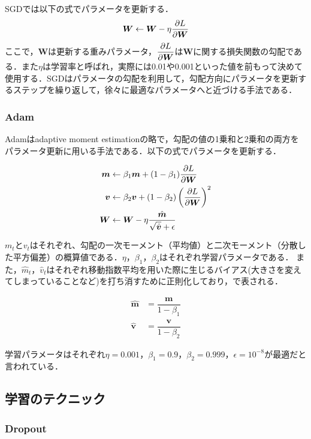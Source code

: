 SGDでは以下の式でパラメータを更新する．
\begin{align}\label{eq:SGD}
	\bm{W} \leftarrow \bm{W} - \eta \dfrac{\partial L}{\partial \bm{W}} 
\end{align}
ここで，$\bm{W}$は更新する重みパラメータ，$\dfrac{\partial L}{\partial \bm{W}}$は$\bm{W}$に関する損失関数の勾配である．また$\eta$は学習率と呼ばれ，実際には0.01や0.001といった値を前もって決めて使用する．SGDはパラメータの勾配を利用して，勾配方向にパラメータを更新するステップを繰り返して，徐々に最適なパラメータへと近づける手法である．

\subsubsection*{Adam}
Adam\cite{Adam}はadaptive moment estimationの略で，勾配の値の1乗和と2乗和の両方をパラメータ更新に用いる手法である．以下の式でパラメータを更新する．

\begin{align}\label{eq:adam}
	\bm{m} & \leftarrow \beta_1 \bm{m} + (1 - \beta_1) \dfrac{\partial L}{\partial \bm{W}} \\
	\bm{v} & \leftarrow \beta_2 \bm{v} + (1 - \beta_2) \left( \dfrac{\partial L}{\partial \bm{W}} \right) ^2 \\
	\bm{W} & \leftarrow \bm{W} - \eta \dfrac{\hat{\bm{m}}}{\sqrt{\hat{\bm{v}}} + \epsilon} 
\end{align}

$m_t$と$v_t$はそれぞれ、勾配の一次モーメント（平均値）と二次モーメント（分散した平方偏差）の概算値である．$\eta$，$\beta_1$，$\beta_2$はそれぞれ学習パラメータである．
また，$\hat{m}_t$，$\hat{v}_t$はそれぞれ移動指数平均を用いた際に生じるバイアス(大きさを変えてしまっていることなど)を打ち消すために正則化しており，で表される．

\begin{align}\label{eq:adamhat}
	\hat{\bm{m}} & = \dfrac{\bm{m}}{1 - \beta_1} \\
	\hat{\bm{v}} & = \dfrac{\bm{v}}{1 - \beta_2}
\end{align}

学習パラメータはそれぞれ$\eta = 0.001$，$\beta_1 = 0.9$，$\beta_2 = 0.999$，$\epsilon = 10^{-8}$が最適だと言われている．

\subsection{学習のテクニック}
\subsubsection*{Dropout}


